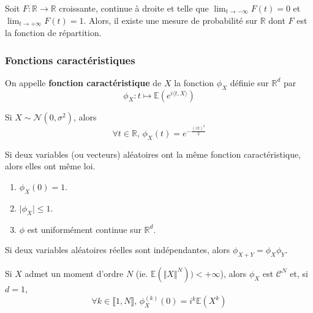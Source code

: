 	\begin{theorem}
		Soit $F : \mathbb{R} \rightarrow \mathbb{R}$ croissante, continue à droite et telle que $\lim_{t \rightarrow -\infty} F(t) = 0$ et $\lim_{t \rightarrow +\infty} F(t) = 1$. Alors, il existe une mesure de probabilité sur $\mathbb{R}$ dont $F$ est la fonction de répartition.
	\end{theorem}
	
	\subsubsection{Fonctions caractéristiques}
	
	
	\begin{definition}
		On appelle \textbf{fonction caractéristique} de $X$ la fonction $\phi_X$ définie sur $\mathbb{R}^d$ par
		\[ \phi_X : t \mapsto \mathbb{E}\left( e^{i \langle t, X \rangle} \right) \]
	\end{definition}
	
	
	\begin{example}
		Si $X \sim \mathcal{N}(0, \sigma^2)$, alors
		\[ \forall t \in \mathbb{R}, \, \phi_X(t) = e^{-\frac{(xt)^2}{2}} \]
	\end{example}
	
	
	\begin{theorem}
		Si deux variables (ou vecteurs) aléatoires ont la même fonction caractéristique, alors elles ont même loi.
	\end{theorem}
	
	\begin{theorem}
		\begin{enumerate}[label=(\roman*)]
			\item $\phi_X(0) = 1$.
			\item $\vert \phi_X \vert \leq 1$.
			\item $\phi$ est uniformément continue sur $\mathbb{R}^d$.
		\end{enumerate}
	\end{theorem}
	
	\begin{proposition}
		Si deux variables aléatoires réelles sont indépendantes, alors $\phi_{X+Y} = \phi_X \phi_Y$.
	\end{proposition}
	
	\begin{theorem}
		Si $X$ admet un moment d'ordre $N$ (ie. $\mathbb{E}(\Vert X \Vert^N)) < +\infty$), alors $\phi_X$ est $\mathcal{C}^N$ et, si $d = 1$,
		\[ \forall k \in \llbracket 1, N \rrbracket, \, \phi_X^{(k)}(0) = i^k \mathbb{E}(X^k) \]
	\end{theorem}
	
